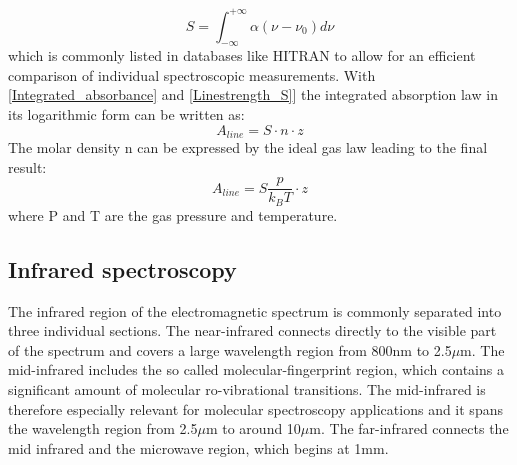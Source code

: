 \begin{equation}
S = \int_{-\infty}^{+\infty}  \alpha(\nu-\nu_0) d\nu
\label{Linestrength_S}
\end{equation}
which is commonly listed in databases like HITRAN to allow for an efficient comparison of individual spectroscopic measurements.
With \ref{Integrated_absorbance} and \ref{Linestrength_S}] the integrated absorption law in its logarithmic form can be written as:
\begin{equation}
A_{line} = S \cdot n \cdot z
\label{Beer_law_integrated} 
\end{equation}
The molar density n can be expressed by the ideal gas law leading to the final result:
\begin{equation}
	A_{line} = S \frac{p}{k_B T} \cdot z
	\label{Beer_law_ABS_integrated} 
\end{equation}
where P and T are the gas pressure and temperature.
\subsection{Infrared spectroscopy}
The infrared region of the electromagnetic spectrum is commonly separated into three individual sections. The near-infrared connects directly to the visible part of the spectrum and covers a large wavelength region from 800nm to 2.5$\mu$m. The mid-infrared includes the so called molecular-fingerprint region, which contains a significant amount of molecular ro-vibrational transitions. The mid-infrared is therefore especially relevant for molecular spectroscopy applications and it spans the wavelength region from 2.5$\mu$m to around 10$\mu$m. The far-infrared connects the mid infrared and the microwave region, which begins at 1mm.
